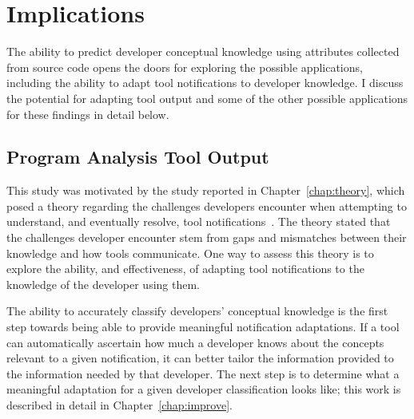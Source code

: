 \section{Implications}\label{sec:disc}
The ability to predict developer conceptual knowledge using attributes collected from source code opens the doors for exploring the possible applications, including the ability to adapt tool notifications to developer knowledge. 
I discuss the potential for adapting tool output and some of the other possible applications for these findings in detail below.

\subsection{Program Analysis Tool Output}
This study was motivated by the study reported in Chapter~\ref{chap:theory}, which posed a theory regarding the challenges developers encounter when attempting to understand, and eventually resolve, tool notifications~\cite{johnson2016cross}. The theory stated that the challenges developer encounter stem from gaps and mismatches between their knowledge and how tools communicate. One way to assess this theory is to explore the ability, and effectiveness, of adapting tool notifications to the knowledge of the developer using them.


The ability to accurately classify developers' conceptual knowledge is the first step towards being able to provide meaningful notification adaptations. If a tool can automatically ascertain how much a developer knows about the concepts relevant to a given notification, it can better tailor the information provided to the information needed by that developer. The next step is to determine what a meaningful adaptation for a given developer classification looks like; this work is described in detail in Chapter~\ref{chap:improve}.

